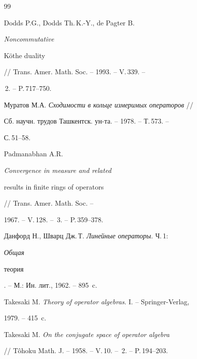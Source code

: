 \begin{thebibliography}{99}


Dodds P.G., Dodds Th.\,K.-Y., de Pagter B. {\em Noncommutative 


K{\"o}the duality} // Trans. Amer. Math. Soc. -- 1993. -- V.\,339. --


\No\,2. -- P.\,717--750.




Муратов М.А. {\em Сходимости в кольце измеримых операторов} // 


Сб. научн. трудов Ташкентск. ун-та. -- 1978. -- Т.\,573. --


С.\,51--58.




Padmanabhan A.R. {\em Convergence in measure and related 


results in finite rings of operators} // Trans. Amer. Math. Soc. --


1967. -- V.\,128. -- \No\,3. -- P.\,359--378.




Данфорд Н., Шварц Дж.\,Т. {\em Линейные операторы}. Ч.\,1: {\em Общая 


теория}. -- М.: Ин. лит., 1962. -- 895~c.




Takesaki M. {\em Theory of operator algebras}. I. -- Springer-Verlag,


1979. -- 415~c.




Takesaki M. {\em On the conjugate space of operator algebra}


// T{\^o}hoku Math. J. -- 1958. -- V.\,10. -- \No\,2. -- P.\,194--203.





\end{thebibliography}





\vskip 2cm












\label{end}











